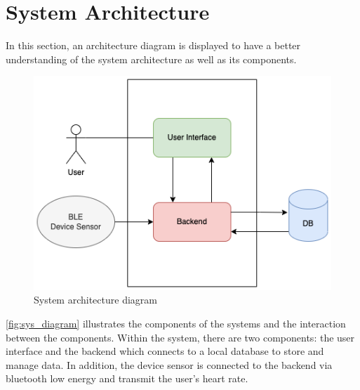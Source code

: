 \section{System Architecture}
In this section, an architecture diagram is displayed to have a better understanding of the system architecture as well as its components.
\begin{figure}[H]
    \centering
    \includegraphics[width=1\textwidth]{diagrams/system-diagram.drawio.png}
    \caption{System architecture diagram}
    \label{fig:sys_diagram}
\end{figure}
\autoref{fig:sys_diagram} illustrates the components of the systems and the interaction between the components. Within the system, there are two components: the user interface and the backend which connects to a local database to store and manage data.
In addition, the device sensor is connected to the backend via bluetooth low energy and transmit the user's heart rate.